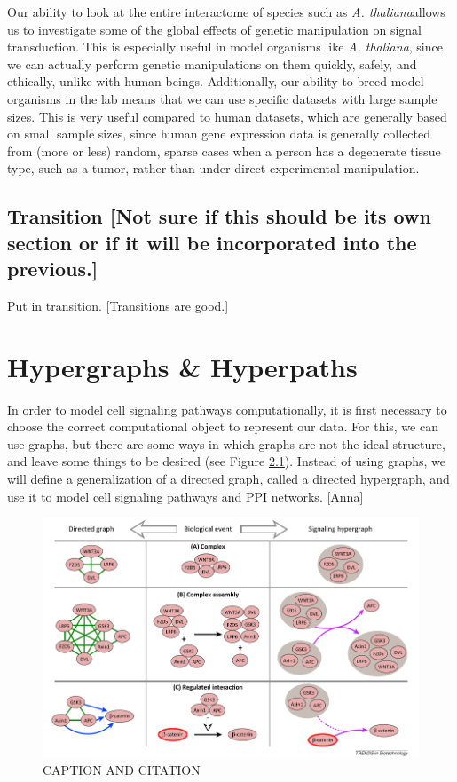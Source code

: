 \documentclass[12pt,twoside]{reedthesis}
\newcommand{\new}[2]{{\color{orange}#1 [#2]}}
\theoremstyle{definition}
\newcommand{\arabidopsis}{\textit{A. thaliana}}
\begin{document}
Our ability to look at the entire interactome of species such as \arabidopsis allows us to investigate some of the global effects of genetic manipulation on signal transduction. This is especially useful in model organisms like \arabidopsis, since we can actually perform genetic manipulations on them quickly, safely, and ethically, unlike with human beings. Additionally, our ability to breed model organisms in the lab means that we can use specific datasets with large sample sizes. This is very useful compared to human datasets, which are generally based on small sample sizes, since human gene expression data is generally collected from (more or less) random, sparse cases when a person has a degenerate tissue type, such as a tumor, rather than under direct experimental manipulation.\par

\section{\new{Transition}{Not sure if this should be its own section or if it will be incorporated into the previous.}}

\new{Put in transition.}{Transitions are good.}

\chapter{Hypergraphs \& Hyperpaths}

\new{In order to model cell signaling pathways computationally, it is first necessary to choose the correct computational object to represent our data. For this, we can use graphs, but there are some ways in which graphs are not the ideal structure, and leave some things to be desired (see Figure \ref{fig:anna_fig}). Instead of using graphs, we will define a generalization of a directed graph, called a directed hypergraph, and use it to model cell signaling pathways and PPI networks.}{Anna}

\begin{figure}[h]
  \begin{center}
    \includegraphics[width=\textwidth]{anna_fig}
  \caption[The issue with standard graphs.]{CAPTION AND CITATION}
  \label{fig:anna_fig}
  \end{center}
\end{figure}
\end{document}
